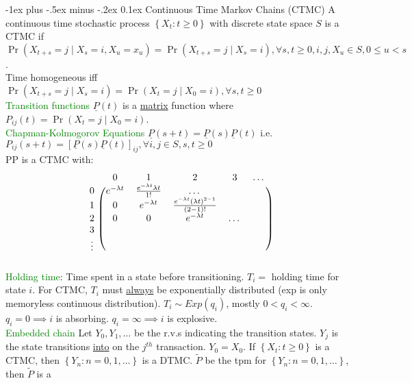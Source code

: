 \documentclass[landscape]{article}
\makeatletter
\renewcommand{\section}{\@startsection{section}{1}{0mm}%
                                {-1ex plus -.5ex minus -.2ex}%
                                {0.1ex}%
                                {\color{blue}\normalfont\large\bfseries}}
\makeatother
\begin{document}
\begin{multicols*}{3}
\section{Continuous Time Markov Chains (CTMC)}
A continuous time stochastic process $\left\{X_t : t \geq 0\right\}$
with discrete state space $S$ is a CTMC if
$\Pr(X_{t+s} = j \mid X_s = i, X_u = x_u) = \Pr(X_{t+s} = j \mid X_s =
i), \forall s,t \geq 0, i, j, X_u \in S, 0 \leq u < s$.  \\ Time
homogeneous iff
$\Pr(X_{t+s} = j \mid X_s = i) = \Pr(X_t = j \mid X_0 = i), \forall
s,t \geq 0$ \\ \textcolor{green}{Transition functions}
$\underline{P}(t)$ is a \underline{matrix} function where
$P_{ij}(t) = \Pr(X_t = j \mid X_0 = i)$.  \\
\textcolor{green}{Chapman-Kolmogorov Equations}
$\underline{P}(s + t) = \underline{P}(s)\underline{P}(t)$ i.e.\
$P_{ij}(s+t) = [\underline{P}(s)\underline{P}(t)]_{ij}, \forall i,j
\in S, s,t \geq 0$ \\ PP is a CTMC with:
 $$ \begin{blockarray}{cccccc}
   & 0 & 1 & 2 & 3 & \ldots \\
   \begin{block}{c(ccccc)}
     0 & e^{-\lambda t} & \frac{e^{-\lambda t} \lambda t}{1!} & \ldots
     \\ 1 & 0 & e^{-\lambda t} & \frac{e^{-\lambda t}(\lambda
       t)^{2-1}}{(2-1)!}  \\ 2 & 0 & 0 & e^{-\lambda t} & \ldots \\ 3
     & \\ \vdots &
     \\
   \end{block}
 \end{blockarray}$$ \textcolor{green}{Holding time}: Time spent in a
 state before transitioning. $T_i =$ holding time for state $i$. For
 CTMC, $T_i$ must \underline{always} be exponentially
 distributed (exp is only memoryless continuous distribution). $T_i \sim Exp(q_i)$, mostly $0 < q_i < \infty$.
 $q_i = 0 \implies i$ is absorbing. $q_i = \infty \implies i$ is
 explosive.  \\ \textcolor{green}{Embedded chain}
 Let $Y_0, Y_1, \ldots$ be the r.v.s indicating the
 transition states. $Y_j$ is the state transitions \underline{into} on
 the $j^{th}$ transaction. $Y_0= X_0 $. If
 $\left\{X_t: t \geq 0\right\}$ is a CTMC, then
 $\left\{Y_n : n = 0, 1, \ldots\right\}$ is a DTMC. $\tilde{P}$ be the
 tpm for $\left\{Y_n : n = 0,1, \ldots\right\}$, then $\tilde{P}$ is a

\end{multicols*}
\end{document}
